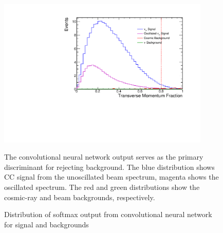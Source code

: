 \begin{figure}[t]
\begin{center}
\includegraphics[width=0.9\textwidth]{figures/selection/n1_tranMom.pdf}
\end{center}
\caption{Distribution of softmax output from convolutional neural network for signal and backgrounds}{
The convolutional neural network output serves as the primary discriminant for
rejecting background.
The blue distribution shows \numu CC signal from the unoscillated beam spectrum,
magenta shows the oscillated spectrum.
The red and green distributions show the cosmic-ray and beam backgrounds,
respectively.
}
\label{tranMom}
\end{figure}








